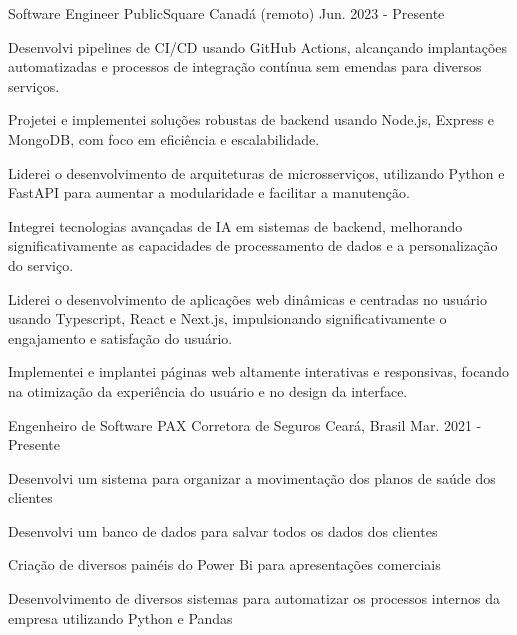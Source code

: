 

\begin{cventries}

\cventry
{Software Engineer} %
{PublicSquare} %
{Canadá (remoto)} %
{Jun. 2023 - Presente} %
{
  \begin{cvitems} %
    \item {Desenvolvi pipelines de CI/CD usando GitHub Actions, alcançando implantações automatizadas e processos de integração contínua sem emendas para diversos serviços.}
    \item {Projetei e implementei soluções robustas de backend usando Node.js, Express e MongoDB, com foco em eficiência e escalabilidade.}
    \item {Liderei o desenvolvimento de arquiteturas de microsserviços, utilizando Python e FastAPI para aumentar a modularidade e facilitar a manutenção.}
    \item {Integrei tecnologias avançadas de IA em sistemas de backend, melhorando significativamente as capacidades de processamento de dados e a personalização do serviço.}
    \item {Liderei o desenvolvimento de aplicações web dinâmicas e centradas no usuário usando Typescript, React e Next.js, impulsionando significativamente o engajamento e satisfação do usuário.}
    \item {Implementei e implantei páginas web altamente interativas e responsivas, focando na otimização da experiência do usuário e no design da interface.}
  \end{cvitems}
}



  \cventry
    {Engenheiro de Software} %
    {PAX Corretora de
    Seguros} %
    {Ceará, Brasil} %
    {Mar. 2021 - Presente} %
    {
      \begin{cvitems} %
        \item {Desenvolvi um sistema para organizar a movimentação dos planos de saúde dos clientes}
        \item {Desenvolvi um banco de dados
        para salvar todos os dados dos clientes}
        \item {Criação de diversos painéis do Power Bi para apresentações comerciais}
        \item {Desenvolvimento de diversos
        sistemas para automatizar os processos internos da empresa utilizando Python e Pandas}
      \end{cvitems}
    }


\end{cventries}
